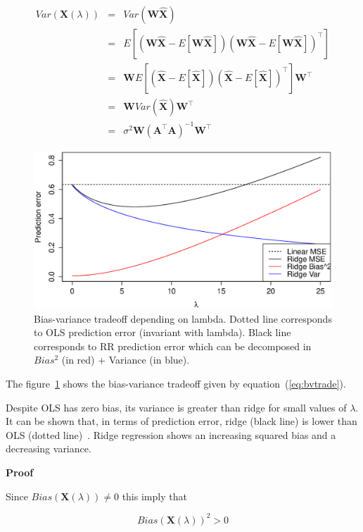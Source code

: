 \begin{eqnarray*}
Var(\mathbf{X}(\lambda)) &=& Var(\mathbf{W}\hat{\mathbf{X}}) \\
&=& E[(\mathbf{W}\hat{\mathbf{X}}-E[\mathbf{W}\hat{\mathbf{X}}])(\mathbf{W}\hat{\mathbf{X}}-E[\mathbf{W}\hat{\mathbf{X}}])^\top] \\
&=& \mathbf{W}E[(\hat{\mathbf{X}}-E[\hat{\mathbf{X}}])(\hat{\mathbf{X}}-E[\hat{\mathbf{X}}])^\top] \mathbf{W}^\top \\
&=& \mathbf{W}Var(\hat{\mathbf{X}})\mathbf{W}^\top \\
&=& \sigma^2 \mathbf{W}(\mathbf{A}^\top \mathbf{A} )^{-1}\mathbf{W}^\top
\end{eqnarray*}

\begin{figure}[h!]
\includegraphics[width=\linewidth]{img/biasvariance}
\caption{Bias-variance tradeoff depending on lambda. Dotted line corresponds to OLS prediction error (invariant with lambda). Black line corresponds to RR prediction error which can be decomposed in $Bias^2$ (in red) + Variance (in blue).}
\label{fig:biasvariance}
\end{figure}	


The figure~\ref{fig:biasvariance} shows the bias-variance tradeoff
given by equation~(\ref{eq:bvtrade}). 

Despite OLS has zero bias,
its variance is greater than ridge for small values of $\lambda$.
It can be shown that, in terms of prediction error, ridge (black line)
is lower than OLS (dotted line)~\cite{hoerl1970}. Ridge regression shows an
increasing squared bias and a decreasing variance.

\textbf{Proof}\quad

Since $Bias(\mathbf{X}(\lambda)) \neq 0$ this imply that

\begin{equation*}
Bias(\mathbf{X}(\lambda)) ^2 > 0 
\end{equation*}

